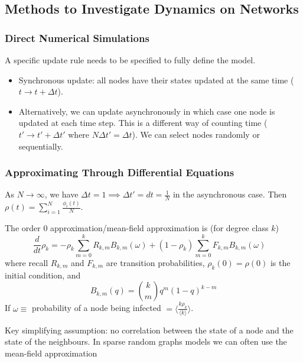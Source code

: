 \documentclass[12pt]{article}
\theoremstyle{definition}
\begin{document}
\subsection{Methods to Investigate Dynamics on Networks}

\subsubsection{Direct Numerical Simulations}

A specific update rule needs to be specified to fully define the model. 
\begin{itemize}
    \item Synchronous update: all nodes have their states updated at the same time ($t\to t+\Delta t$). 
    \item Alternatively, we can update asynchronously in which case one node is updated at each time step. This is a different way of counting time ($t'\to t'+\Delta t'$ where $N\Delta t'=\Delta t$). We can select nodes randomly or sequentially. 
\end{itemize}

\subsubsection{Approximating Through Differential Equations}

As $N\to \infty$, we have $\Delta t = 1\implies \Delta t' = dt = \frac1N$ in the asynchronous case. Then $\rho(t)=\sum_{i=1}^N\frac{\phi_i(t)}{N}$. 

The order 0 approximation/mean-field approximation is (for degree class $k$)
\[
\frac{d}{dt}\rho_k=-\rho_k\sum_{m=0}^k R_{k,m}B_{k,m}(\omega)+(1-\rho_k)\sum_{m=0}^k F_{k,m}B_{k,m}(\omega) \quad
\]
where recall $R_{k,m}$ and $F_{k,m}$ are transition probabilities, $\rho_k(0)=\rho(0)$ is the initial condition, and 
\[
B_{k,m}(q)=\binom k m q^m(1-q)^{k-m}
\]
If $\omega\equiv$ probability of a node being infected $=\langle\frac{k\rho_k}{\langle k \rangle}\rangle$.

Key simplifying assumption: no correlation between the state of a node and the state of the neighbours. In sparse random graphs models we can often use the mean-field approximation
\end{document}
